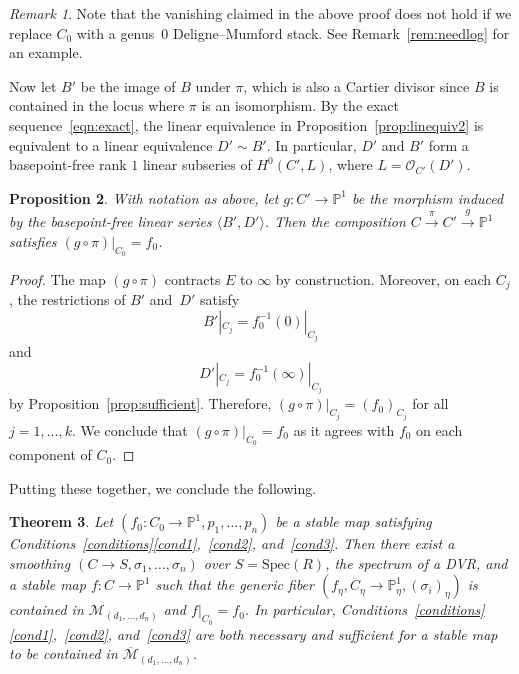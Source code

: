 \documentclass[11pt]{amsart}
\numberwithin{equation}{section}
\newtheorem{theorem}{Theorem}[section]
\newtheorem{prop}[theorem]{Proposition}
\theoremstyle{definition}
\theoremstyle{remark}
\newtheorem{remark}[theorem]{Remark}
\newcommand{\bP}{{\mathbb P}}
\newcommand{\calO}{\mathcal O}
\newcommand{\Spec}{\mathrm{Spec}}
\newcommand{\mapsd}{\mathcal{M}_{(d_1, \ldots, d_n)}}
\newcommand{\mapsdc}{\overline{\mathcal{M}}_{(d_1, \ldots, d_n)}}
\begin{document}
\begin{remark}
Note that the vanishing claimed in the above proof does not hold if we replace $C_0$ with a genus~$0$ Deligne--Mumford stack. See Remark~\ref{rem:needlog} for an example.
\end{remark}

Now let $B'$ be the image of $B$ under $\pi$, which is also a Cartier divisor since $B$ is contained in the locus where $\pi$ is an isomorphism. By the exact sequence~\eqref{eqn:exact}, the linear equivalence in Proposition~\ref{prop:linequiv2} is equivalent to a linear equivalence $D' \sim B'$. In particular, $D'$ and $B'$ form a basepoint-free rank $1$ linear subseries of $H^0(C', L)$, where $L = \calO_{C'}(D')$.

\begin{prop}\label{prop:linequiv1}
With notation as above, let $g\colon  C' \to \bP^1$ be the morphism induced by the basepoint-free linear series $\langle B', D' \rangle$. Then the composition $C \xrightarrow{\pi} C' \xrightarrow{g} \bP^1$ satisfies $(g \circ \pi)|_{C_0} = f_0$. 
\end{prop}

\begin{proof}
The map $(g \circ \pi)$ contracts $E$ to $\infty$ by construction. Moreover, on each $C_j$, the restrictions of $B'$ and~$D'$ satisfy 
$$
B'|_{C_j} = f_0^{-1}(0)|_{C_j}
$$
and 
$$
D'|_{C_j} = f_0^{-1}(\infty)|_{C_j}
$$
by Proposition~\ref{prop:sufficient}. Therefore, $(g \circ \pi)|_{C_j} = (f_0)_{C_j}$ for all $j = 1, \ldots, k$. We conclude that $(g \circ \pi)|_{C_0} = f_0$ as it agrees with $f_0$ on each component of $C_0$. \end{proof}

Putting these together, we conclude the following. 

\begin{theorem}\label{thm:sufficient} Let $(f_0  \colon C_0 \to \bP^1, p_1, \ldots, p_n)$ be a stable map satisfying Conditions~\ref{conditions}\eqref{cond1},~\eqref{cond2}, and~\eqref{cond3}. Then there exist a smoothing $(C \to S, \sigma_1, \ldots, \sigma_n)$ over $S = \Spec(R)$, the spectrum of a DVR, and a stable map $f \colon C \to \bP^1$ such that the generic fiber $(f_\eta, C_\eta \to \bP^1_\eta, (\sigma_i)_\eta)$ is contained in $\mapsd$ and $f|_{C_0} = f_0$. In particular, Conditions~\ref{conditions}\eqref{cond1},~\eqref{cond2}, and~\eqref{cond3} are both necessary and sufficient for a stable map to be contained in $\mapsdc$. 
\end{theorem}
\end{document}
